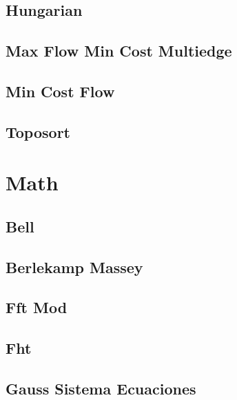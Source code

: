 \documentclass[9pt,portrait,twocolumn,a4paper,notitlepage]{article}
\newcommand\cppfile[2][]{%
\ifstrempty{#1}{}{}%
}
\begin{document}
\subsection{Hungarian}
\cppfile{grafos_clean/hungarian.cpp}

\subsection{Max Flow Min Cost Multiedge}
\cppfile{grafos_clean/max_flow_min_cost_multiedge.cpp}

\subsection{Min Cost Flow}
\cppfile{grafos_clean/min_cost_flow.cpp}

\subsection{Toposort}
\cppfile{grafos_clean/toposort.cpp}


\section{Math}

\subsection{Bell}
\cppfile{math_clean/bell.cpp}

\subsection{Berlekamp Massey}
\cppfile{math_clean/berlekamp_massey.cpp}

\subsection{Fft Mod}
\cppfile{math_clean/fft_mod.cpp}

\subsection{Fht}
\cppfile{math_clean/fht.cpp}

\subsection{Gauss Sistema Ecuaciones}
\cppfile{math_clean/gauss_sistema_ecuaciones.cpp}
\end{document}
